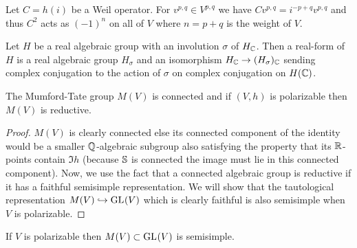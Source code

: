 \documentclass[12pt]{article}
\begin{document}
\begin{remark}
Let $C = h(i)$ be a Weil operator. For $v^{p,q} \in V^{p,q}$ we have $C v^{p,q} = i^{-p + q} v^{p, q}$ and thus $C^2$ acts as $(-1)^n$ on all of $V$ where $n = p + q$ is the weight of $V$. 
\end{remark}

\begin{definition}
Let $H$ be a real algebraic group with an involution $\sigma$ of $H_\C$. Then a real-form of $H$ is a real algebraic group $H_\sigma$ and an isomorphism $H_\C \to (H_\sigma)_\C$ sending complex conjugation to the action of $\sigma$ on complex conjugation on $H(\C)$. 
\end{definition}

\begin{theorem}
The Mumford-Tate group $M(V)$ is connected and if $(V, h)$ is polarizable then $M(V)$ is reductive.
\end{theorem}

\begin{proof}
$M(V)$ is clearly connected else its connected component of the identity would be a smaller $\Q$-algebraic subgroup also satisfying the property that its $\R$-points contain $\Im{h}$ (because $\S$ is connected the image must lie in this connected component). Now, we use the fact that a connected algebraic group is reductive if it has a faithful semisimple representation. We will show that the tautological representation $M(V) \embed \GL{}{V}$ which is clearly faithful is also semisimple when $V$ is polarizable.  
\end{proof}

\begin{proposition}
If $V$ is polarizable then $M(V) \subset \GL{}{V}$ is semisimple. 
\end{proposition}

\newcommand{\inner}[2]{\left< #1, #2 \right>}
\end{document}

